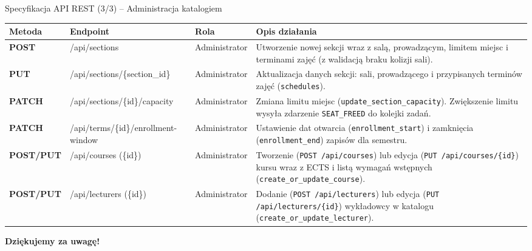 \documentclass[aspectratio=169, 10pt, xcolor=table]{beamer}
\renewcommand{\arraystretch}{1.18}
\begin{document}
\begin{frame}{Specyfikacja API REST (3/3) -- Administracja katalogiem}
    \scriptsize
    \renewcommand{\arraystretch}{1.12}
    \begin{tabularx}{\textwidth}{@{} >{\bfseries\color{BlueBrand}}l M{0.35\textwidth} L{0.13\textwidth} Y @{}}
        \toprule
        \textbf{\textcolor{NavyPrimary}{Metoda}} & \textbf{\textsf{\textcolor{NavyPrimary}{Endpoint}}} & \textbf{\textcolor{NavyPrimary}{Rola}} & \textbf{\textcolor{NavyPrimary}{Opis działania}} \\
        \midrule
        POST & /api/sections & Administrator & Utworzenie nowej sekcji wraz z salą, prowadzącym, limitem miejsc i terminami zajęć (z walidacją braku kolizji sali). \\
        PUT & /api/sections/\{section\_id\} & Administrator & Aktualizacja danych sekcji: sali, prowadzącego i przypisanych terminów zajęć (\texttt{schedules}). \\
        PATCH & /api/sections/\{id\}/capacity & Administrator & Zmiana limitu miejsc (\texttt{update\_section\_capacity}). Zwiększenie limitu wysyła zdarzenie \texttt{SEAT\_FREED} do kolejki zadań. \\
        PATCH & /api/terms/\{id\}/enrollment-window & Administrator & Ustawienie dat otwarcia (\texttt{enrollment\_start}) i zamknięcia (\texttt{enrollment\_end}) zapisów dla semestru. \\
        POST/PUT & /api/courses (\{id\}) & Administrator & Tworzenie (\texttt{POST /api/courses}) lub edycja (\texttt{PUT /api/courses/\{id\}}) kursu wraz z ECTS i listą wymagań wstępnych (\texttt{create\_or\_update\_course}). \\
        POST/PUT & /api/lecturers (\{id\}) & Administrator & Dodanie (\texttt{POST /api/lecturers}) lub edycja (\texttt{PUT /api/lecturers/\{id\}}) wykładowcy w katalogu (\texttt{create\_or\_update\_lecturer}). \\
        \bottomrule
    \end{tabularx}
\end{frame}

\begin{frame}{}
    \scriptsize
    \renewcommand{\arraystretch}{1.18}
    \vfill %
    \centering
    \Huge \textbf{Dziękujemy za uwagę!}
    
    \vfill %
\end{frame}
\end{document}
